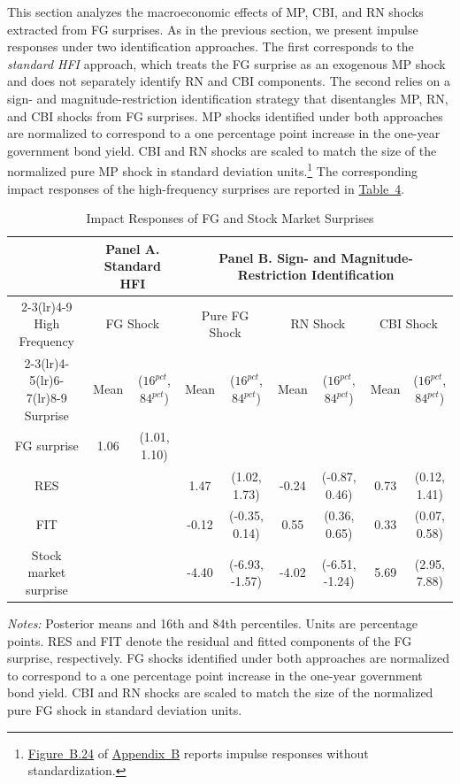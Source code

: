 \documentclass[12pt, reqno]{article}
\begin{document}
This section analyzes the macroeconomic effects of MP, CBI, and RN shocks extracted from FG surprises. As in the previous section, we present impulse responses under two identification approaches. The first corresponds to the \emph{standard HFI} approach, which treats the FG surprise as an exogenous MP shock and does not separately identify RN and CBI components. The second relies on a sign- and magnitude-restriction identification strategy that disentangles MP, RN, and CBI shocks from FG surprises. MP shocks identified under both approaches are normalized to correspond to a one percentage point increase in the one-year government bond yield. CBI and RN shocks are scaled to match the size of the normalized pure MP shock in standard deviation units.\footnote{\hyperlink{Figure B.24}{Figure~B.24} of \hyperlink{Appendix B}{Appendix~B} reports impulse responses without standardization.} The corresponding impact responses of the high-frequency surprises are reported in \hyperlink{Table 4}{Table~4}.

\begin{table}[t]
\hypertarget{Panel AT3}{}
\hypertarget{Panel BT3}{}
\hypertarget{Table 3}{}
\begin{center}
\resizebox{16cm}{!} {
\begin{tabular}{c c c c c c c c c}
\toprule
& \multicolumn{2}{c}{Panel A. Standard HFI}
& \multicolumn{6}{c}{Panel B. Sign- and Magnitude-Restriction Identification} \\
\cmidrule(lr){2-3}\cmidrule(lr){4-9}
High Frequency
& \multicolumn{2}{c}{FG Shock}
& \multicolumn{2}{c}{Pure FG Shock}
& \multicolumn{2}{c}{RN Shock}
& \multicolumn{2}{c}{CBI Shock} \\
\cmidrule(lr){2-3}\cmidrule(lr){4-5}\cmidrule(lr){6-7}\cmidrule(lr){8-9}
Surprise
& Mean & ($16^{pct}$, $84^{pct}$)
& Mean & ($16^{pct}$, $84^{pct}$)
& Mean & ($16^{pct}$, $84^{pct}$)
& Mean & ($16^{pct}$, $84^{pct}$) \\
\midrule
FG surprise
& 1.06 & (1.01, 1.10)
&  & 
&   & 
&   &  \\
RES
&  & 
& 1.47 & (1.02, 1.73)
& -0.24 & (-0.87, 0.46)
& 0.73 & (0.12, 1.41) \\
FIT
&   & 
& -0.12 & (-0.35, 0.14)
& 0.55 & (0.36, 0.65)
& 0.33 & (0.07, 0.58) \\
Stock market surprise
&   & 
& -4.40 & (-6.93, -1.57)
& -4.02 & (-6.51, -1.24)
& 5.69 & (2.95, 7.88) \\
\bottomrule
\end{tabular}}
\caption{Impact Responses of FG and Stock Market Surprises}
\end{center}
\begin{footnotesize}
\textit{Notes:} Posterior means and 16th and 84th percentiles. Units are percentage points. RES and FIT denote the residual and fitted components of the FG surprise, respectively. FG shocks identified under both approaches are normalized to correspond to a one percentage point increase in the one-year government bond yield. CBI and RN shocks are scaled to match the size of the normalized pure FG shock in standard deviation units.
\end{footnotesize}
\end{table}
\end{document}
